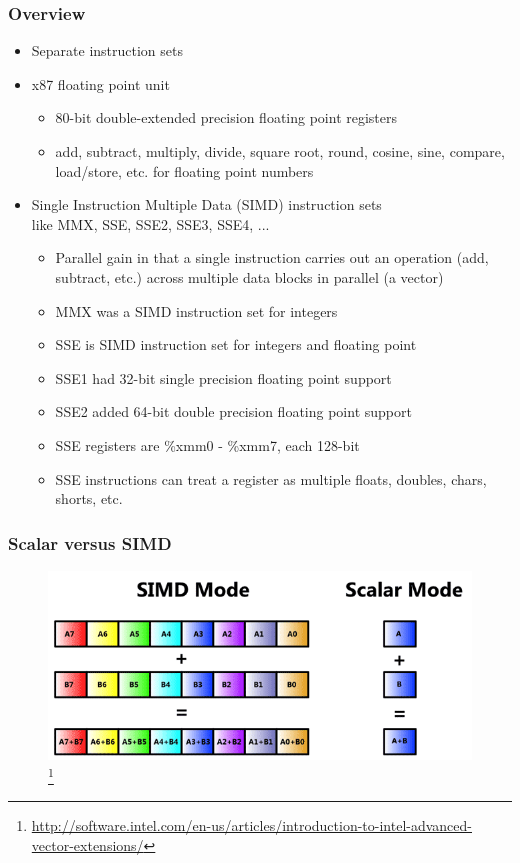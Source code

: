 \documentclass[11pt,xcolor=dvipsnames]{beamer}
\begin{document}
\begin{frame}[fragile,t]
\frametitle{Overview}
\begin{itemize}
  \item Separate instruction sets
  \item x87 floating point unit
  \begin{itemize}
    \item 80-bit double-extended precision floating point registers
    \item add, subtract, multiply, divide, square root, round, cosine, sine, compare, load/store, etc. for floating point numbers
  \end{itemize}
  \pause
  \item Single Instruction Multiple Data (SIMD) instruction sets \\ like MMX, SSE, SSE2, SSE3, SSE4, ...
  \begin{itemize}
    \item Parallel gain in that a single instruction carries out an operation (add, subtract, etc.) across multiple data blocks in parallel (a vector)
    \item MMX was a SIMD instruction set for integers
    \pause
    \item SSE is SIMD instruction set for integers and floating point
    \pause
    \item SSE1 had 32-bit single precision floating point support 
    \item SSE2 added 64-bit double precision floating point support
    \pause
    \item SSE registers are {\%xmm0 - \%xmm7}, each 128-bit
    \item SSE instructions can treat a register as multiple floats, doubles, chars, shorts, etc.
  \end{itemize}
\end{itemize}
\end{frame}

\begin{frame}[fragile,t]
\frametitle{Scalar versus SIMD}
\begin{figure}
\centering
\includegraphics[width=\textwidth]{figures/simd.png}
\footnote{\url{http://software.intel.com/en-us/articles/introduction-to-intel-advanced-vector-extensions/}}
\end{figure}
\end{frame}
\end{document}
